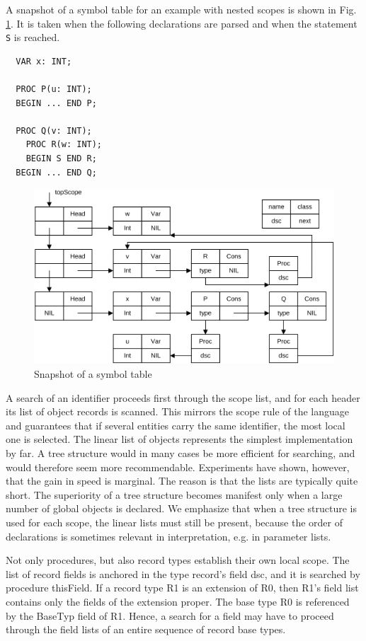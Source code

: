 A snapshot of a symbol table for an example with nested scopes is shown in Fig. \ref{fig:symsnap}.
It is taken when the following declarations are parsed and when the statement \verb|S| is reached.
\begin{verbatim}
  VAR x: INT;
  
  PROC P(u: INT);
  BEGIN ... END P;
  
  PROC Q(v: INT);
    PROC R(w: INT);
    BEGIN S END R;
  BEGIN ... END Q;
\end{verbatim}

\begin{figure}[h!]
  \centering
  \includegraphics[width=\textwidth]{i/C/7.png}
  \caption{Snapshot of a symbol table}
  \label{fig:symsnap}
\end{figure}
A search of an identifier proceeds first through the scope list, and for each header its list of object
records is scanned. This mirrors the scope rule of the language and guarantees that if several
entities carry the same identifier, the most local one is selected. The linear list of objects represents
the simplest implementation by far. A tree structure would in many cases be more efficient for
searching, and would therefore seem more recommendable. Experiments have shown, however,
that the gain in speed is marginal. The reason is that the lists are typically quite short. The
superiority of a tree structure becomes manifest only when a large number of global objects is
declared. We emphasize that when a tree structure is used for each scope, the linear lists must still
be present, because the order of declarations is sometimes relevant in interpretation, e.g. in
parameter lists.

Not only procedures, but also record types establish their own local scope. The list of record fields
is anchored in the type record's field dsc, and it is searched by procedure thisField. If a record type
R1 is an extension of R0, then R1's field list contains only the fields of the extension proper. The
base type R0 is referenced by the BaseTyp field of R1. Hence, a search for a field may have to
proceed through the field lists of an entire sequence of record base types.

